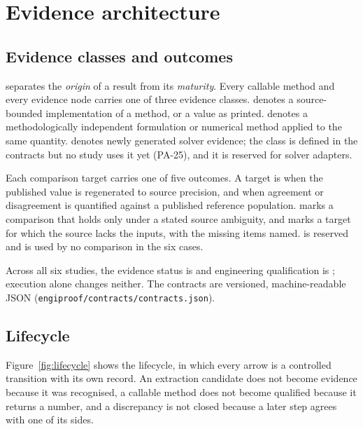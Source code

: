 \section{Evidence architecture}
\label{sec:framework}

\subsection{Evidence classes and outcomes}
\engiproof{} separates the \emph{origin} of a result from its \emph{maturity}. Every callable method and every evidence node carries one of three evidence classes.  denotes a source-bounded implementation of a method, or a value as printed.  denotes a methodologically independent formulation or numerical method applied to the same quantity.  denotes newly generated solver evidence; the class is defined in the contracts but no study uses it yet (PA-25), and it is reserved for solver adapters.

Each comparison target carries one of five outcomes. A target is  when the published value is regenerated to source precision, and  when agreement or disagreement is quantified against a published reference population.  marks a comparison that holds only under a stated source ambiguity, and  marks a target for which the source lacks the inputs, with the missing items named.  is reserved and is used by no comparison in the six cases.

Across all six studies, the evidence status is  and engineering qualification is ; execution alone changes neither. The contracts are versioned, machine-readable JSON (\texttt{engiproof/\allowbreak{}contracts/\allowbreak{}contracts.json}).

\subsection{Lifecycle}
Figure~\ref{fig:lifecycle} shows the lifecycle, in which every arrow is a controlled transition with its own record. An extraction candidate does not become evidence because it was recognised, a callable method does not become qualified because it returns a number, and a discrepancy is not closed because a later step agrees with one of its sides.

